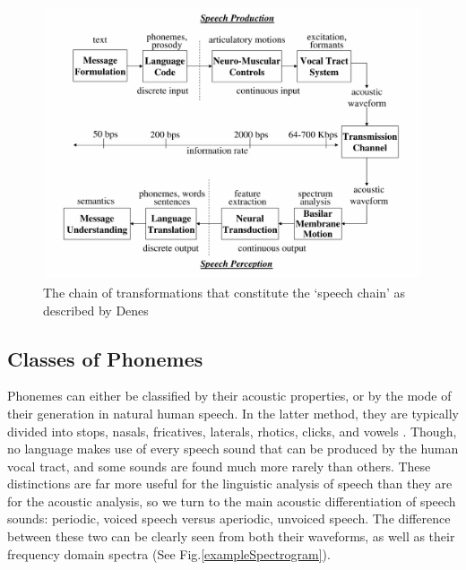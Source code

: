 \documentclass[titlepage]{article}
\begin{document}
    \begin{figure}
      \centering
      \includegraphics[scale=0.3]{speechChain}
      \caption{The chain of transformations that constitute the `speech chain' as
      described by Denes \cite{Denes1993,Rabiner2007}}
      \label{speechChain}
    \end{figure}

  \subsection{Classes of Phonemes}

    Phonemes can either be classified by their acoustic properties,
    or by the mode of their generation in natural human speech. In the latter
    method, they are typically divided into stops, nasals, fricatives, laterals, rhotics,
    clicks, and vowels \cite{Ladefoged1996}. Though, no language makes use of every speech sound
    that can be produced by the human vocal tract, and some sounds are found much
    more rarely than others. These distinctions are far more useful for the linguistic analysis
    of speech than they are for the acoustic analysis, so we turn to the main acoustic
    differentiation of speech sounds: periodic, voiced speech versus aperiodic, unvoiced speech.
    The difference between these two can be clearly seen from both their waveforms, as well as
    their frequency domain spectra (See Fig.\ref{exampleSpectrogram}).
\end{document}
